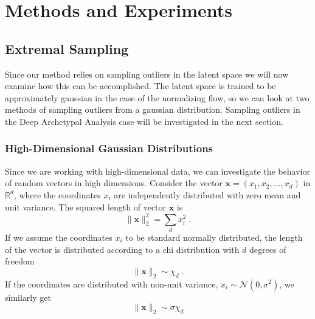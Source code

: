 \chapter{Methods and Experiments}%
\label{cha:methods}



\section{Extremal Sampling}%
\label{sec:extremal_sampling}

Since our method relies on sampling outliers in the latent space we will now
examine how this can be accomplished. The latent space is trained to be
approximately gaussian in the case of the normalizing flow, so we can look at
two methods of sampling outliers from a gaussian distribution. Sampling
outliers in the Deep Archetypal Analysis case will be investigated in the next
section.

\subsection{High-Dimensional Gaussian Distributions}%
\label{sub:high_dimensional_gaussian_distributions}
Since we are working with high-dimensional data, we can investigate the
behavior of random vectors in high dimensions.
Consider the vector $\mathbf{x} = (x_1, x_2, \dots, x_d)$ in $\mathbb{R}^d$, where the
coordinates $x_i$ are independently distributed with zero mean and unit
variance. The squared length of vector $\mathbf{x}$ is
\begin{equation}%
	\label{eq:square_norm}
	\lVert \mathbf{x} \rVert_2^2 = \sum_d x_i^2\;.
\end{equation}
If we assume the coordinates $x_i$ to be standard normally distributed, the
length of the vector is distributed according to a chi distribution with
$d$ degrees of freedom
\begin{equation}%
	\label{eq:sq_norm_chi}
	\lVert \mathbf{x} \rVert_2 \sim \chi_d\;.
\end{equation}
If the coordinates are distributed with non-unit variance, $x_i \sim
	\mathcal{N}(0, \sigma^2)$, we similarly get
\begin{equation}%
	\label{eq:sq_norm_chi_sigma}
	\lVert \mathbf{x} \rVert_2 \sim \sigma\chi_d
\end{equation}

